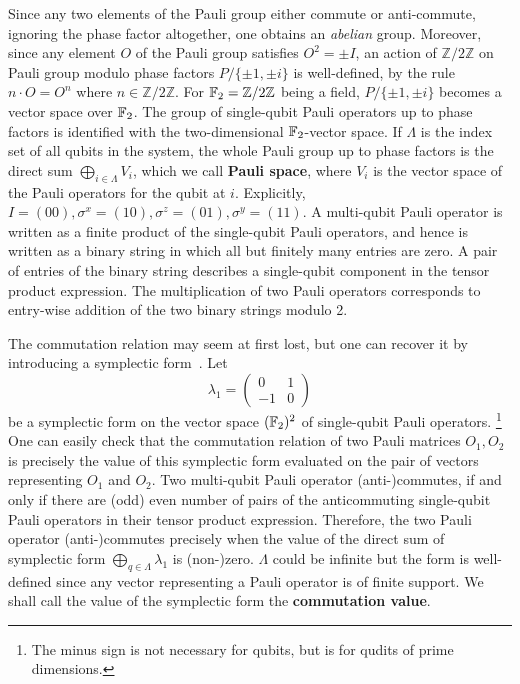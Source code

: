 Since any two elements of the Pauli group either commute or anti-commute,
ignoring the phase factor altogether, one obtains an {\em abelian} group.
Moreover, since any element $O$ of the Pauli group satisfies $O^2 = \pm I$,
an action of $\mathbb{Z}/2\mathbb{Z}$ on Pauli group modulo phase factors
$P / \{\pm 1, \pm i\}$ is well-defined,
by the rule $ n \cdot O = O^n$ where $n \in \mathbb{Z}/2\mathbb{Z}$.
For $\mathbb{F}_2 = \mathbb{Z}/2\mathbb{Z}$ being a field,
$P / \{\pm 1, \pm i\}$ becomes a vector space over $\mathbb{F}_2$.
The group of single-qubit Pauli operators up to phase factors
is identified with the two-dimensional $\mathbb{F}_2$-vector space.
If $\Lambda$ is the index set of all qubits in the system,
the whole Pauli group up to phase factors is the direct sum $\bigoplus_{i \in \Lambda} V_i$,
which we call {\bf Pauli space},
where $V_i$ is the vector space of the Pauli operators for the qubit at $i$.
Explicitly, $I = (00), \sigma^x = (10), \sigma^z = (01), \sigma^y = (11)$.
A multi-qubit Pauli operator
is written as a finite product of the single-qubit Pauli operators,
and hence is written as a binary string in which all but finitely many entries are zero.
A pair of entries of the binary string describes a single-qubit component in the tensor product expression.
The multiplication of two Pauli operators corresponds to entry-wise addition of the two binary strings modulo 2.


The commutation relation may seem at first lost,
but one can recover it by introducing a symplectic form~\cite{CalderbankRainsShorEtAl1997Quantum}.
Let
\[
 \lambda_1 = \begin{pmatrix} 0 & 1 \\ -1 & 0 \end{pmatrix}
\]
be a symplectic form on the vector space $(\mathbb{F}_2)^2$ of single-qubit Pauli operators.%
%
\footnote{The minus sign is not necessary for qubits, but is for qudits of prime dimensions.}
%
One can easily check that the commutation relation of two Pauli matrices $O_1, O_2$
is precisely the value of this symplectic form
evaluated on the pair of vectors representing $O_1$ and $O_2$.
Two multi-qubit Pauli operator (anti-)commutes, if and only if
there are (odd) even number of pairs of the anticommuting single-qubit Pauli operators
in their tensor product expression.
Therefore, the two Pauli operator \mbox{(anti-)}commutes
precisely when the value of the direct sum of symplectic form $\bigoplus_{q \in \Lambda} \lambda_1$ is \mbox{(non-)}zero. 
$\Lambda$ could be infinite but the form is well-defined since any vector representing a Pauli operator is of finite support.
We shall call the value of the symplectic form the {\bf commutation value}.

